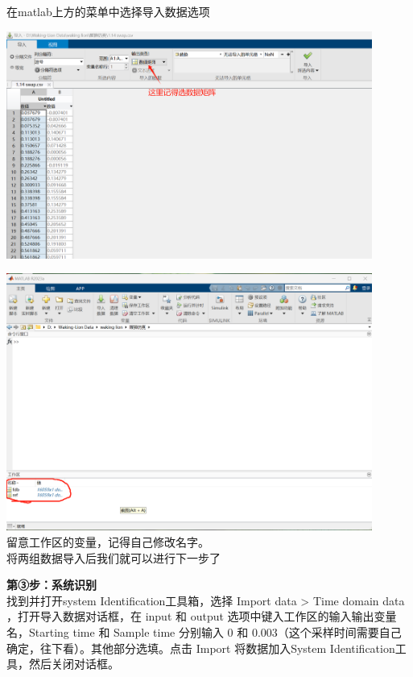 \documentclass[UTF8,a4paper,12pt]{ctexart}
\begin{document}
\begin{flushleft}
\begin{flushleft}
      \end{flushleft}
      \begin{flushleft}
        在matlab上方的菜单中选择导入数据选项
        \par \includegraphics[width=12cm]{picture/data_impot.png}
        \par \includegraphics[width=12cm]{picture/data_impot1.png}
        \\留意工作区的变量，记得自己修改名字。
        \\将两组数据导入后我们就可以进行下一步了
      \end{flushleft}
      \begin{flushleft}
        \textbf{第③步：系统识别}\\
        找到并打开system Identification工具箱，选择 Import data > Time domain data ，打开导入数据对话框，在 input 和 output 选项中键入工作区的输入输出变量名，Starting time 和 Sample time 分别输入 0 和 0.003（这个采样时间需要自己确定，往下看）。其他部分选填。点击 Import 将数据加入System Identification工具，然后关闭对话框。
      \end{flushleft}
      \begin{flushleft}
        

\end{flushleft}
\end{flushleft}
\end{document}
